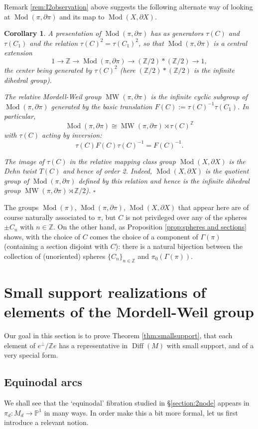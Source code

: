 \documentclass[10pt,letterpaper]{amsart}
\numberwithin{equation}{section}
\def\PP{{\mathbb P}}
\def\ZZ{{\mathbb Z}}
\def\G{\Gamma}
\newcommand{\p}{\partial}
\newcommand\Diff{\operatorname{Diff}}
\newcommand\Mod{\operatorname{Mod}}
\newcommand\MW{\operatorname{MW}}
\newtheorem{corollary}[theorem]{Corollary}
\theoremstyle{remark}
\begin{document}
Remark \ref{rem:I2observation} above suggests the following alternate way of looking at 
$\Mod(\pi, \p\pi)$ and its map to $\Mod(X, \p X)$.

\begin{corollary}\label{cor:MWpresentation}
A presentation of  $\Mod(\pi, \p\pi)$  has as  generators  
$\tau(C)$ and $\tau(C_1)$ and  the relation 
$\tau(C)^2=\tau(C_1)^2$,  so that $\Mod(\pi, \p\pi)$ is a central extension
\[
1\to\mathbb{Z}\to \Mod(\pi, \p\pi)\to (\ZZ/2) * (\ZZ/2) \to 1,
\]
the center being generated by $\tau(C)^2$ (here $(\ZZ/2) *(\ZZ/2)$ is the infinite dihedral group).

The relative Mordell-Weil group $\MW(\pi, \p \pi)$  is the infinite cyclic subgroup of $\Mod(\pi, \p\pi)$ generated by  the basic translation $F(C):=\tau(C)^{-1}\tau(C_{1})$.  In particular, 
\[\Mod(\pi, \p\pi)\cong \MW(\pi, \p \pi)\rtimes \tau(C)^\ZZ\] 
with $\tau(C)$ acting by inversion: 
\[ 
\tau(C)F(C)\tau(C)^{-1}=F(C)^{-1}.
\]

The image of $\tau(C)$ in the relative mapping class group $\Mod(X, \p X)$ is the Dehn twist $T(C)$ and hence of order 2. Indeed, $\Mod(X, \p X)$ is  the quotient group of $\Mod(\pi, \p\pi)$ defined by this relation and hence  is the infinite dihedral group $\MW(\pi, \p \pi)\rtimes \ZZ/2$).
  \hfill $\square$
\end{corollary}

The groups $\Mod(\pi)$, $\Mod(\pi, \p\pi)$, $\Mod (X, \p X)$ that appear here are of course naturally associated to $\pi$, but $C$ is not privileged over any of  
the spheres $\pm C_n$ with $n\in \ZZ$. On the other hand,  as Proposition \ref{prop:spheres and sections} shows, with the  choice of $C$ comes the choice of a component of $\G(\pi)$ (containing a section disjoint with $C$): 
there is a natural bijection between the collection of (unoriented) spheres $\{C_n\}_{n\in \ZZ}$ and $\pi_0(\G(\pi))$.

\section{Small support realizations of elements of the Mordell-Weil group}
\label{section:smallsup}

Our goal in this section is to prove Theorem \ref{thm:smallsupport}, that each element of $e^\perp/\ZZ e$ has a representative in $\Diff(M)$ 
with small support, and of a very special form.  

\subsection{Equinodal arcs} We shall see that the `equinodal' fibration studied in \S\ref{section:2node} appears in $\pi_d : M_d\to \PP^1$ in many ways.  In order make this a bit more formal, let us first introduce a relevant notion.
 
\end{document}

